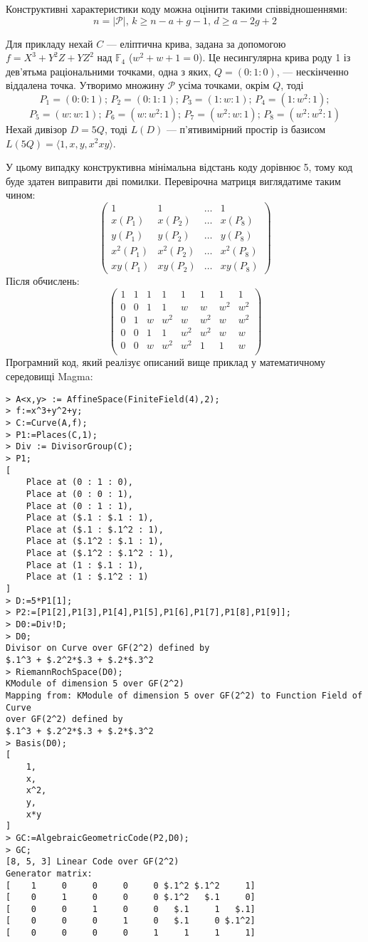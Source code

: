 \documentclass[a4paper,14pt,oneside]{extarticle}
\begin{document}
Конструктивні характеристики коду можна оцінити такими співвідношеннями:
$$n=|\mathcal{P}|, \, k \ge n-a+g-1, \, d \ge a-2g+2$$

Для прикладу нехай $C$ --- еліптична крива, задана за допомогою $f=X^3+Y^2Z+YZ^2$ над $\mathbb{F}_4$ ($w^2+w+1=0$). 
Це несингулярна крива роду 1 із дев'ятьма раціональними точками, одна з яких, $Q=(0:1:0)$, --- нескінченно віддалена точка. 
Утворимо множину $\mathcal{P}$ усіма точками, окрім $Q$, тоді
$$P_1 = (0 : 0 : 1); \, P_2 = (0 : 1 : 1); \, P_3 = (1 : w : 1); \, P_4 = (1 : w^2 : 1);$$ 
$$P_5 = (w : w : 1); \, P_6 = (w : w^2 : 1); \, P_7 = (w^2 : w : 1); \, P_8 = (w^2 : w^2 : 1)$$
Нехай дивізор $D=5Q$, тоді $L(D)$ --- п'ятивимірний простір із базисом $L(5Q) = \langle 1, x, y, x^2 xy \rangle$.

У цьому випадку конструктивна мінімальна відстань коду дорівнює 5, тому код буде здатен виправити дві помилки.
Перевірочна матриця виглядатиме таким чином:
$$
\begin{pmatrix}
1 & 1 & \dots & 1 \\
x(P_1) & x(P_2) & \dots & x(P_8) \\
y(P_1) & y(P_2) & \dots & y(P_8) \\
x^2(P_1) & x^2(P_2) & \dots & x^2(P_8) \\
xy(P_1) & xy(P_2) & \dots & xy(P_8)
\end{pmatrix}
$$
Після обчислень:
$$
\begin{pmatrix}
1 & 1 & 1 & 1 & 1 & 1 & 1 & 1 \\
0 & 0 & 1 & 1 & w & w & w^2 & w^2 \\
0 & 1 & w & w^2 & w & w^2 & w & w^2 \\
0 & 0 & 1 & 1 & w^2 & w^2 & w & w \\
0 & 0 & w & w^2 & w^2 & 1 & 1 & w \\
\end{pmatrix}
$$
Програмний код, який реалізує описаний вище приклад у математичному середовищі Magma:
\begin{verbatim}
> A<x,y> := AffineSpace(FiniteField(4),2);
> f:=x^3+y^2+y;
> C:=Curve(A,f);
> P1:=Places(C,1);
> Div := DivisorGroup(C);
> P1;
[
    Place at (0 : 1 : 0),
    Place at (0 : 0 : 1),
    Place at (0 : 1 : 1),
    Place at ($.1 : $.1 : 1),
    Place at ($.1 : $.1^2 : 1),
    Place at ($.1^2 : $.1 : 1),
    Place at ($.1^2 : $.1^2 : 1),
    Place at (1 : $.1 : 1),
    Place at (1 : $.1^2 : 1)
]
> D:=5*P1[1];
> P2:=[P1[2],P1[3],P1[4],P1[5],P1[6],P1[7],P1[8],P1[9]];
> D0:=Div!D;
> D0;
Divisor on Curve over GF(2^2) defined by
$.1^3 + $.2^2*$.3 + $.2*$.3^2
> RiemannRochSpace(D0);
KModule of dimension 5 over GF(2^2)
Mapping from: KModule of dimension 5 over GF(2^2) to Function Field of Curve 
over GF(2^2) defined by
$.1^3 + $.2^2*$.3 + $.2*$.3^2
> Basis(D0);
[
    1,
    x,
    x^2,
    y,
    x*y
]
> GC:=AlgebraicGeometricCode(P2,D0);
> GC;
[8, 5, 3] Linear Code over GF(2^2)
Generator matrix:
[    1     0     0     0     0 $.1^2 $.1^2     1]
[    0     1     0     0     0 $.1^2   $.1     0]
[    0     0     1     0     0   $.1     1   $.1]
[    0     0     0     1     0   $.1     0 $.1^2]
[    0     0     0     0     1     1     1     1]
\end{verbatim}
\end{document}
